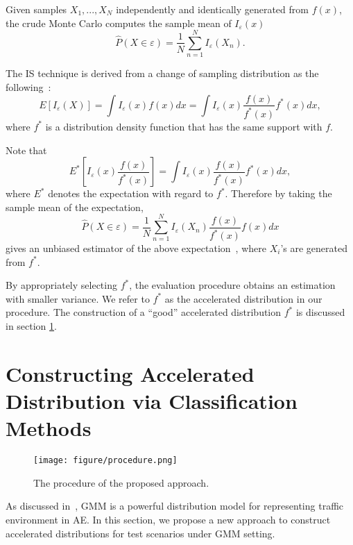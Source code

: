 \documentclass[letterpaper, 10 pt, journal]{IEEEtran}  %
\begin{document}
Given samples $X_1,...,X_N$ independently and identically generated from $f(x)$, the crude Monte Carlo computes the sample mean of $I_\varepsilon(x)$ \begin{equation}
	\hat{P}(X \in \varepsilon) = \frac{1}{N} \sum_{n=1}^N I_\varepsilon(X_n).
\end{equation}

The IS technique is derived from a change of sampling distribution as the following~\cite{asmussen2007stochastic}:\begin{equation}
	E[I_\varepsilon(X)]=\int I_\varepsilon(x) f(x) dx = \int I_\varepsilon(x) \frac{f(x)}{f^*(x)} f^*(x) dx,
\end{equation}
where $f^*$ is a distribution density function that has the same support with $f$.

Note that 
\begin{equation}
	E^*[I_\varepsilon(x) \frac{f(x)}{f^*(x)} ] = \int I_\varepsilon(x) \frac{f(x)}{f^*(x)} f^*(x) dx,
\end{equation}
where $E^*$ denotes the expectation with regard to $f^*$. Therefore by taking the sample mean of the expectation, \begin{equation}\label{eq:is_estimator}
	\hat{P}(X \in \varepsilon) = \frac{1}{N} \sum_{n=1}^N I_\varepsilon(X_n) \frac{f(x)}{f^*(x)}f(x)dx \end{equation}
gives an unbiased estimator of the above expectation~\cite{asmussen2007stochastic}, where $X_i$'s are generated from $f^*$. 

By appropriately selecting $f^*$, the evaluation procedure obtains an estimation with smaller variance. We refer to $f^*$ as the accelerated distribution in our procedure. The construction of a ``good'' accelerated distribution $f^*$ is discussed in section \ref{sec:approach}. 






\section{Constructing Accelerated Distribution via Classification Methods} \label{sec:approach}
\begin{figure}[t]
	\centering
	\texttt{[image: figure/procedure.png]}
	\caption{The procedure of the proposed approach.}
	\label{fig:procedure}
\end{figure}
As discussed in~\cite{huang2017acceleratedb}, GMM is a powerful distribution model for representing traffic environment in AE. In this section, we propose a new approach to construct accelerated distributions for test scenarios under GMM setting.
\end{document}
